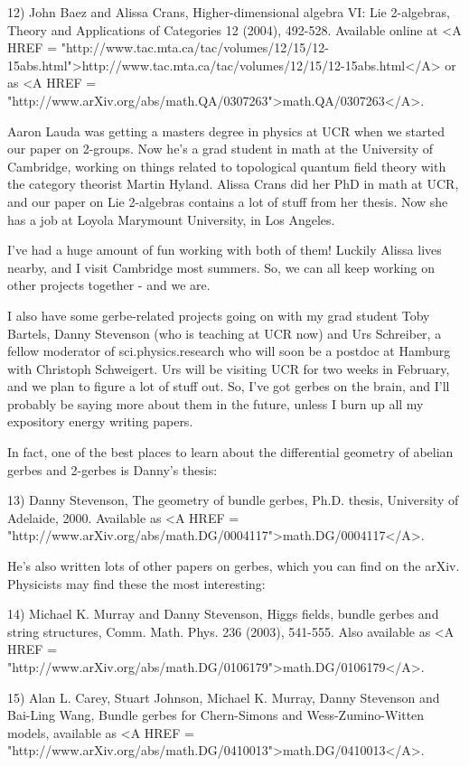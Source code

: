 12) John Baez and Alissa Crans, Higher-dimensional algebra VI: Lie
2-algebras, Theory and Applications of Categories 12 (2004), 492-528.
Available online at <A HREF =
"http://www.tac.mta.ca/tac/volumes/12/15/12-15abs.html">http://www.tac.mta.ca/tac/volumes/12/15/12-15abs.html</A>
or as <A HREF =
"http://www.arXiv.org/abs/math.QA/0307263">math.QA/0307263</A>.

Aaron Lauda was getting a masters degree in physics at UCR when we started 
our paper on 2-groups.  Now he's a grad student in math at the University of
Cambridge, working on things related to topological quantum field theory 
with the category theorist Martin Hyland.  Alissa Crans did her PhD in math
at UCR, and our paper on Lie 2-algebras contains a lot of stuff from her 
thesis.  Now she has a job at Loyola Marymount University, in Los Angeles.  

I've had a huge amount of fun working with both of them!  Luckily Alissa 
lives nearby, and I visit Cambridge most summers.  So, we can all keep 
working on other projects together - and we are.

I also have some gerbe-related projects going on with my grad student
Toby Bartels, Danny Stevenson (who is teaching at UCR now) and Urs 
Schreiber, a fellow moderator of sci.physics.research who will soon be 
a postdoc at Hamburg with Christoph Schweigert.  Urs will be visiting 
UCR for two weeks in February, and we plan to figure a lot of stuff out.
So, I've got gerbes on the brain, and I'll probably be saying more about 
them in the future, unless I burn up all my expository energy writing 
papers.

In fact, one of the best places to learn about the differential geometry 
of abelian gerbes and 2-gerbes is Danny's thesis:

13) Danny Stevenson, The geometry of bundle gerbes, Ph.D. thesis, 
University of Adelaide, 2000.  Available as <A HREF = "http://www.arXiv.org/abs/math.DG/0004117">math.DG/0004117</A>.

He's also written lots of other papers on gerbes, which you can find
on the arXiv.  Physicists may find these the most interesting:

14) Michael K. Murray and Danny Stevenson, Higgs fields, bundle gerbes and
string structures, Comm. Math. Phys. 236 (2003), 541-555.  Also available
as <A HREF = "http://www.arXiv.org/abs/math.DG/0106179">math.DG/0106179</A>.

15) Alan L. Carey, Stuart Johnson, Michael K. Murray, Danny Stevenson
and Bai-Ling Wang, Bundle gerbes for Chern-Simons and Wess-Zumino-Witten
models, available as <A HREF = "http://www.arXiv.org/abs/math.DG/0410013">math.DG/0410013</A>.


